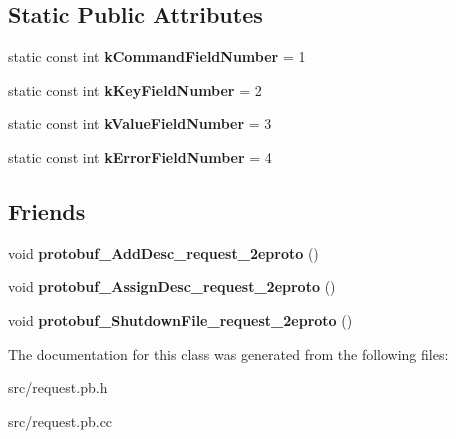 \subsection*{Static Public Attributes}
\begin{DoxyCompactItemize}
\item 
\hypertarget{classmessaging_1_1RequestMessage_a0c270411775903d07b58c6a5f865a3f8}{
static const int {\bfseries kCommandFieldNumber} = 1}
\label{classmessaging_1_1RequestMessage_a0c270411775903d07b58c6a5f865a3f8}

\item 
\hypertarget{classmessaging_1_1RequestMessage_a45d521e094860d2d622b17b5975282a5}{
static const int {\bfseries kKeyFieldNumber} = 2}
\label{classmessaging_1_1RequestMessage_a45d521e094860d2d622b17b5975282a5}

\item 
\hypertarget{classmessaging_1_1RequestMessage_a4fbfbd44dc0ea50f4a8f197895ad93ba}{
static const int {\bfseries kValueFieldNumber} = 3}
\label{classmessaging_1_1RequestMessage_a4fbfbd44dc0ea50f4a8f197895ad93ba}

\item 
\hypertarget{classmessaging_1_1RequestMessage_a4557cc932a5964f9827b3c2c9c52ab66}{
static const int {\bfseries kErrorFieldNumber} = 4}
\label{classmessaging_1_1RequestMessage_a4557cc932a5964f9827b3c2c9c52ab66}

\end{DoxyCompactItemize}
\subsection*{Friends}
\begin{DoxyCompactItemize}
\item 
\hypertarget{classmessaging_1_1RequestMessage_a02a86ef57244d57785784c27ff592220}{
void {\bfseries protobuf\_\-AddDesc\_\-request\_\-2eproto} ()}
\label{classmessaging_1_1RequestMessage_a02a86ef57244d57785784c27ff592220}

\item 
\hypertarget{classmessaging_1_1RequestMessage_a7d9c7404130d39c1e3e4e21fb2ffefb4}{
void {\bfseries protobuf\_\-AssignDesc\_\-request\_\-2eproto} ()}
\label{classmessaging_1_1RequestMessage_a7d9c7404130d39c1e3e4e21fb2ffefb4}

\item 
\hypertarget{classmessaging_1_1RequestMessage_a11a96ccaf635e1f5d5668b1055933760}{
void {\bfseries protobuf\_\-ShutdownFile\_\-request\_\-2eproto} ()}
\label{classmessaging_1_1RequestMessage_a11a96ccaf635e1f5d5668b1055933760}

\end{DoxyCompactItemize}


The documentation for this class was generated from the following files:\begin{DoxyCompactItemize}
\item 
src/request.pb.h\item 
src/request.pb.cc\end{DoxyCompactItemize}
